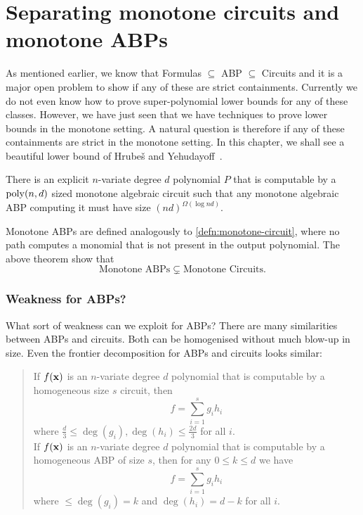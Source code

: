 \chapter{Separating monotone circuits and monotone ABPs}\label{chap:monABPCktSep}

\newcommand{\MonChi}{\operatorname{Mon}}
\newcommand{\EIP}{\operatorname{EIP}}

As mentioned earlier, we know that Formulas $\subseteq$ ABP $\subseteq$ Circuits and it is a major open problem to show if any of these are strict containments.
Currently we do not even know how to prove super-polynomial lower bounds for any of these classes.
However, we have just seen that we have techniques to prove lower bounds in the monotone setting.
A natural question is therefore if any of these containments are strict in the monotone setting. In this chapter, we shall see a beautiful lower bound of Hrube\v{s} and Yehudayoff~\cite{HY16}.

\begin{theorem}\label{thm:mon-abp-ckt-sep}
  There is an explicit $n$-variate degree $d$ polynomial $P$ that is computable by a $\operatorname{poly}(n,d)$ sized monotone algebraic circuit such that any monotone algebraic ABP computing it must have size $(nd)^{\Omega(\log nd)}$.
\end{theorem}

Monotone ABPs are defined analogously to \autoref{defn:monotone-circuit}, where no path computes a monomial that is not present in the output polynomial. The above theorem show that
  \[
    \text{Monotone ABPs} \subsetneq \text{Monotone Circuits}.
  \]

\subsection*{Weakness for ABPs?}

What sort of weakness can we exploit for ABPs? There are many similarities between ABPs and circuits. Both can be homogenised without much blow-up in size. Even the frontier decomposition for ABPs and circuits looks similar:
\begin{quote}
  If $f(\mathbf{x})$ is an $n$-variate degree $d$ polynomial that is computable by a homogeneous size $s$ circuit, then
  \[
    f = \sum_{i=1}^s g_i h_i
  \]
  where $\frac{d}{3} \leq \deg(g_i),\deg(h_i) \leq \frac{2d}{3}$ for all $i$.\\

  If $f(\mathbf{x})$ is an $n$-variate degree $d$ polynomial that is computable by a homogeneous ABP of size $s$, then for any $0\leq k \leq d$ we have
  \[
    f = \sum_{i=1}^s g_i h_i
  \]
  where $\leq \deg(g_i) = k$ and $\deg(h_i) =  d-k$ for all $i$.
\end{quote}

